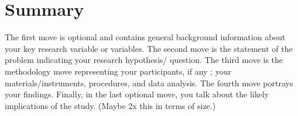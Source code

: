 \chapter{Summary}

The first move is optional and contains general background information about your key research variable or variables.
The second move is the statement of the problem indicating your research hypothesis/ question.
The third move is the methodology move representing your participants, if any ; your materials/instruments, procedures, and data analysis.
The fourth move portrays your findings.
Finally, in the last optional move, you talk about the likely implications of the study. (Maybe 2x this in terms of size.)
